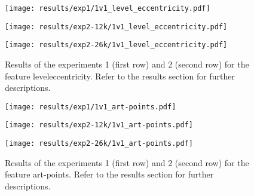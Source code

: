 \begin{figure}[h!]
	\centering
	\begin{minipage}{0.4\linewidth}
		\texttt{[image: results/exp1/1v1\_level\_eccentricity.pdf]}
	\end{minipage}
	
	\begin{minipage}{0.4\linewidth}
		\texttt{[image: results/exp2-12k/1v1\_level\_eccentricity.pdf]}
	\end{minipage}
	\begin{minipage}{0.4\linewidth}
		\texttt{[image: results/exp2-26k/1v1\_level\_eccentricity.pdf]}
	\end{minipage}
	
	\caption[ Results: Feature level\textunderscore eccentricity]{ Results of the experiments 1 (first row) and 2 (second row) for the feature level\textunderscore eccentricity. Refer to the results section for further descriptions. }
	\label{fig:appendix_level_eccentricity}
\end{figure}
\newpage 


\begin{figure}[h!]
	\centering
	\begin{minipage}{0.4\linewidth}
		\texttt{[image: results/exp1/1v1\_art-points.pdf]}
	\end{minipage}
	
	\begin{minipage}{0.4\linewidth}
		\texttt{[image: results/exp2-12k/1v1\_art-points.pdf]}
	\end{minipage}
	\begin{minipage}{0.4\linewidth}
		\texttt{[image: results/exp2-26k/1v1\_art-points.pdf]}
	\end{minipage}
	
	\caption[ Results: Feature art-points]{ Results of the experiments 1 (first row) and 2 (second row) for the feature art-points. Refer to the results section for further descriptions. }
	\label{fig:appendix_art-points}
\end{figure}

